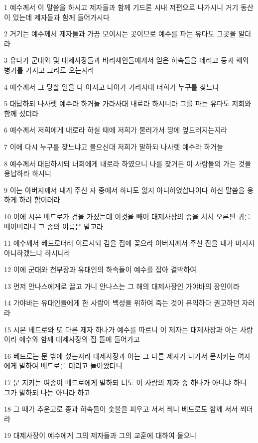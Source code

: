 \par 1 예수께서 이 말씀을 하시고 제자들과 함께 기드론 시내 저편으로 나가시니 거기 동산이 있는데 제자들과 함께 들어가시다
\par 2 거기는 예수께서 제자들과 가끔 모이시는 곳이므로 예수를 파는 유다도 그곳을 알더라
\par 3 유다가 군대와 및 대제사장들과 바리새인들에게서 얻은 하속들을 데리고 등과 홰와 병기를 가지고 그리로 오는지라
\par 4 예수께서 그 당할 일을 다 아시고 나아가 가라사대 너희가 누구를 찾느냐
\par 5 대답하되 나사렛 예수라 하거늘 가라사대 내로라 하시니라 그를 파는 유다도 저희와 함께 섰더라
\par 6 예수께서 저희에게 내로라 하실 때에 저희가 물러가서 땅에 엎드러지는지라
\par 7 이에 다시 누구를 찾느냐고 물으신대 저희가 말하되 나사렛 예수라 하거늘
\par 8 예수께서 대답하시되 너희에게 내로라 하였으니 나를 찾거든 이 사람들의 가는 것을 용납하라 하시니
\par 9 이는 아버지께서 내게 주신 자 중에서 하나도 잃지 아니하였삽나이다 하신 말씀을 응하게 하려 함이러라
\par 10 이에 시몬 베드로가 검을 가졌는데 이것을 빼어 대제사장의 종을 쳐서 오른편 귀를 베어버리니 그 종의 이름은 말고라
\par 11 예수께서 베드로더러 이르시되 검을 집에 꽂으라 아버지께서 주신 잔을 내가 마시지 아니하겠느냐 하시니라
\par 12 이에 군대와 천부장과 유대인의 하속들이 예수를 잡아 결박하여
\par 13 먼저 안나스에게로 끌고 가니 안나스는 그 해의 대제사장인 가야바의 장인이라
\par 14 가야바는 유대인들에게 한 사람이 백성을 위하여 죽는 것이 유익하다 권고하던 자러라
\par 15 시몬 베드로와 또 다른 제자 하나가 예수를 따르니 이 제자는 대제사장과 아는 사람이라 예수와 함께 대제사장의 집 뜰에 들어가고
\par 16 베드로는 문 밖에 섰는지라 대제사장과 아는 그 다른 제자가 나가서 문지키는 여자에게 말하여 베드로를 데리고 들어왔더니
\par 17 문 지키는 여종이 베드로에게 말하되 너도 이 사람의 제자 중 하나가 아니냐 하니 그가 말하되 나는 아니라 하고
\par 18 그 때가 추운고로 종과 하속들이 숯불을 피우고 서서 쬐니 베드로도 함께 서서 쬐더라
\par 19 대제사장이 예수에게 그의 제자들과 그의 교훈에 대하여 물으니
